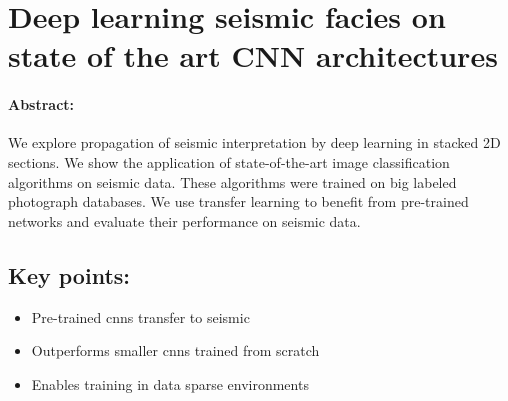 \section{Deep learning seismic facies on state of the art CNN architectures}

\paragraph{Abstract:} We explore propagation of seismic interpretation by deep learning in stacked 2D sections. We show the application of state-of-the-art image classification algorithms on seismic data. These algorithms were trained on big labeled photograph databases. We use transfer learning to benefit from pre-trained networks and evaluate their performance on seismic data.

\subsection*{Key points:}
\begin{itemize}
    \item Pre-trained \aclp{cnn} transfer to seismic
    \item Outperforms smaller \acp{cnn} trained from scratch
    \item Enables training in data sparse environments
\end{itemize}

{\vfill\hfill\newline{}}


